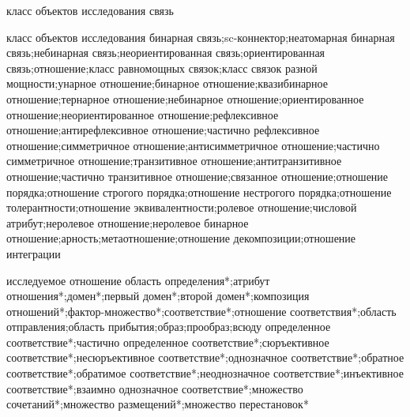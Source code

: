 \begin{SCn}
\scnsectionheader{\currentname}
\begin{scnsubstruct}
\begin{scnhaselementrole}{класс объектов исследования}
связь\end{scnhaselementrole}
\begin{scnhaselementrolelist}{класс объектов исследования}
бинарная связь;sc-коннектор;неатомарная бинарная связь;небинарная связь;неориентированная связь;ориентированная связь;отношение;класс равномощных связок;класс связок разной мощности;унарное отношение;бинарное отношение;квазибинарное отношение;тернарное отношение;небинарное отношение;ориентированное отношение;неориентированное отношение;рефлексивное отношение;антирефлексивное отношение;частично рефлексивное отношение;симметричное отношение;антисимметричное отношение;частично симметричное отношение;транзитивное отношение;антитранзитивное отношение;частично транзитивное отношение;связанное отношение;отношение порядка;отношение строгого порядка;отношение нестрогого порядка;отношение толерантности;отношение эквивалентности;ролевое отношение;числовой атрибут;неролевое отношение;неролевое бинарное отношение;арность;метаотношение;отношение декомпозиции;отношение интеграции
\end{scnhaselementrolelist}
\begin{scnhaselementrolelist}{исследуемое отношение}
область определения*;атрибут отношения*;домен*;первый домен*;второй домен*;композиция отношений*;фактор-множество*;соответствие*;отношение соответствия*;область отправления\scnrolesign;область прибытия\scnrolesign;образ\scnrolesign;прообраз\scnrolesign;всюду определенное соответствие*;частично определенное соответствие*;сюръективное соответствие*;несюръективное соответствие*;однозначное соответствие*;обратное соответствие*;обратимое соответствие*;неоднозначное соответствие*;инъективное соответствие*;взаимно однозначное соответствие*;множество сочетаний*;множество размещений*;множество перестановок*
\end{scnhaselementrolelist}

\end{scnsubstruct}
\end{SCn}

